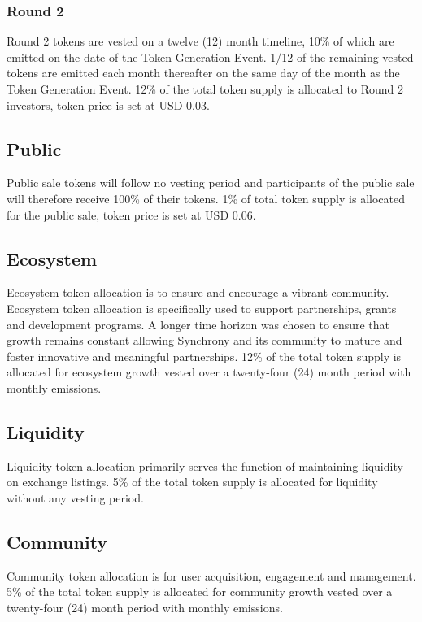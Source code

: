 \documentclass[10pt]{article}
\begin{document}
					\subsubsection{Round 2}
					Round 2 tokens are vested on a twelve (12) month timeline, 10\% of which are
					emitted on the date of the Token Generation Event. 1/12 of the remaining vested
					tokens are emitted each month thereafter on the same day of the month as the
					Token Generation Event. 12\% of the total token supply is allocated to Round 2 investors, token price is set at USD 0.03.

					\subsection{Public}
					Public sale tokens will follow no vesting period and participants of the public
					sale will therefore receive 100\% of their tokens. 1\% of total token supply is 
					allocated for the public sale, token price is set at USD 0.06.

					\subsection{Ecosystem}
					Ecosystem token allocation is to ensure and encourage a vibrant community.
					Ecosystem token allocation is specifically used to support partnerships,
					grants and development programs. A longer time horizon
					was chosen to ensure that growth remains constant allowing Synchrony and its
					community to mature and foster innovative and meaningful partnerships.
					12\% of the total token supply is allocated for ecosystem growth vested over a
					twenty-four (24) month period with monthly emissions. 

					\subsection{Liquidity}
					Liquidity token allocation primarily serves the function of maintaining
					liquidity on exchange listings. 5\% of the total token supply is allocated for
					liquidity without any vesting period. 

					\subsection{Community}
					Community token allocation is for user acquisition, engagement and management.
					5\% of the total token supply is allocated for community growth vested over a 
					twenty-four (24) month period with monthly emissions.
\end{document}
